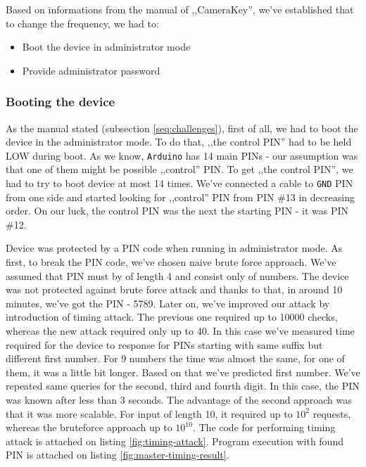 Based on informations from the manual of ,,CameraKey'', we've established that to change the frequency, we had to:

\begin{itemize}
  \item Boot the device in administrator mode
  \item Provide administrator password
\end{itemize}

\subsubsection{Booting the device}

As the manual stated (subsection \ref{seq:challenges}), first of all, we had to boot the device in the administrator mode. To do that, ,,the control PIN'' had to be held LOW during boot. As we know, \texttt{Arduino} has 14 main PINs - our assumption was that one of them might be possible ,,control'' PIN.  To get ,,the control PIN'', we had to try to boot device at most 14 times. We've connected a cable to \texttt{GND} PIN from one side and started looking for ,,control'' PIN from PIN \#13 in decreasing order. On our luck, the control PIN was the next the starting PIN - it was PIN \#12.

Device was protected by a PIN code when running in administrator mode. As first, to break the PIN code, we've chosen naive brute force approach. We've assumed that PIN must by of length 4 and consist only of numbers. The device was not protected against brute force attack and thanks to that, in around 10 minutes, we've got the PIN - 5789. Later on, we've improved our attack by introduction of timing attack. The previous one required up to 10000 checks, whereas the new attack required only up to 40. In this case we've measured time required for the device to response for PINs starting with same suffix but different first number. For 9 numbers the time was almost the same, for one of them, it was a little bit longer. Based on that we've predicted first number. We've repeated same queries for the second, third and fourth digit. In this case, the PIN was known after less than 3 seconds. The advantage of the second approach was that it was more scalable. For input of length 10, it required up to $10^2$ requests, whereas the bruteforce approach up to $10 ^ {10}$. The code for performing timing attack is attached on listing \ref{fig:timing-attack}. Program execution with found PIN is attached on listing \ref{fig:master-timing-result}.

